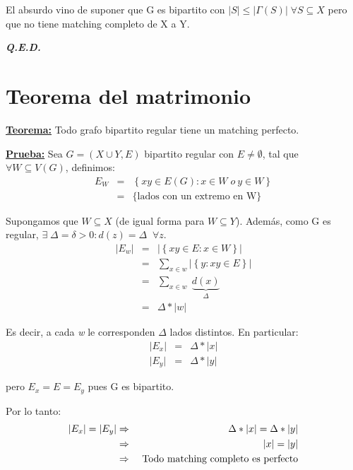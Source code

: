 \documentclass[12pt,a4paper]{report}
\newcounter{neq}
\newcommand{\QED}{\hfill \textit{\textbf{Q.E.D.}}}
\begin{document}
			\par El absurdo vino de suponer que G es bipartito con $\lvert S \rvert \leq \lvert \Gamma(S) \rvert \; \forall S \subseteq X$ pero que no tiene matching completo de X a Y.

		\QED

	\pagebreak
	\section{Teorema del matrimonio}
		\textbf{\underline{Teorema:}} Todo grafo bipartito regular tiene un matching perfecto.

		\textbf{\underline{Prueba:}} Sea $G = (X \cup Y, E)$ bipartito regular con $E \neq \emptyset $, tal que $\forall W \subseteq V(G)$, definimos:
			\begin{eqnarray}
				\nonumber E_{W} &=& \left\lbrace xy \in E(G): x \in W \; o \ y \in W \right\rbrace \\
				\nonumber &=& \lbrace \text{lados con un extremo en W} \rbrace
			\end{eqnarray}

			\par Supongamos que $W \subseteq X$ (de igual forma para $W \subseteq Y$). Además, como G es regular, $\exists \; \Delta  = \delta > 0 : d(z) = \Delta \; \; \forall z$.
			\begin{eqnarray}
				\nonumber \lvert E_{w} \rvert &=& \lvert \left\lbrace xy \in E: x \in W \right\rbrace \rvert \\
				\nonumber &=& \sum_{x \in w} \lvert \left\lbrace y : xy \in E \right\rbrace \rvert \\
				\nonumber &=& \sum_{x \in w} \; \underbrace{d(x)}_{\Delta} \\
				\nonumber &=& \Delta * \lvert w \rvert
			\end{eqnarray}

			\par Es decir, a cada \textit{w} le corresponden $\Delta$ lados distintos. En particular:
			\begin{eqnarray}
				\nonumber \lvert E_{x} \rvert &=& \Delta * \lvert x \rvert \\
				\nonumber \lvert E_{y} \rvert &=& \Delta * \lvert y \rvert
			\end{eqnarray}
			\par pero $E_{x} = E = E_{y}$ pues G es bipartito.

			\vspace{5mm}
			\par Por lo tanto:
			\begin{eqnarray}
				\nonumber \lvert E_{x} \rvert = \lvert E_{y} \rvert &\Rightarrow & \Delta * \lvert x \rvert = \Delta * \lvert y \rvert \\
				\nonumber &\Rightarrow & \lvert x \rvert = \lvert y \rvert \\
				\nonumber &\Rightarrow & \textup{ Todo matching completo es perfecto}
			\end{eqnarray}
\end{document}
